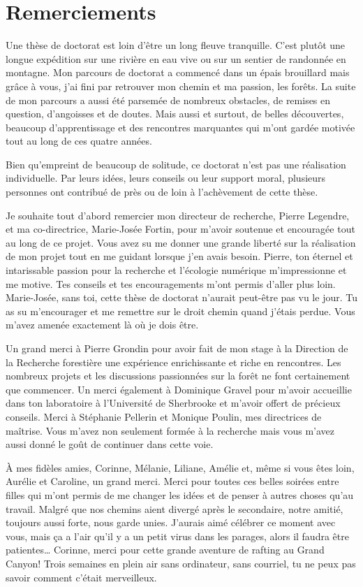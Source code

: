 \francais

\chapter*{Remerciements}

Une thèse de doctorat est loin d'être un long fleuve tranquille. C'est
plutôt une longue expédition sur une rivière en eau vive ou sur un
sentier de randonnée en montagne. Mon parcours de doctorat a commencé
dans un épais brouillard mais grâce à vous, j'ai fini par retrouver mon
chemin et ma passion, les forêts. La suite de mon parcours a aussi été
parsemée de nombreux obstacles, de remises en question, d'angoisses et
de doutes. Mais aussi et surtout, de belles découvertes, beaucoup
d'apprentissage et des rencontres marquantes qui m'ont gardée motivée
tout au long de ces quatre années.

Bien qu'empreint de beaucoup de solitude, ce doctorat n'est pas une
réalisation individuelle. Par leurs idées, leurs conseils ou leur
support moral, plusieurs personnes ont contribué de près ou de loin à
l'achèvement de cette thèse.

Je souhaite tout d'abord remercier mon directeur de recherche, Pierre
Legendre, et ma co-directrice, Marie-Josée Fortin, pour m'avoir soutenue
et encouragée tout au long de ce projet. Vous avez su me donner une
grande liberté sur la réalisation de mon projet tout en me guidant
lorsque j'en avais besoin. Pierre, ton éternel et intarissable passion
pour la recherche et l'écologie numérique m'impressionne et me motive.
Tes conseils et tes encouragements m'ont permis d'aller plus loin.
Marie-Josée, sans toi, cette thèse de doctorat n'aurait peut-être pas vu
le jour. Tu as su m'encourager et me remettre sur le droit chemin quand
j'étais perdue. Vous m'avez amenée exactement là où je dois être.

Un grand merci à Pierre Grondin pour avoir fait de mon stage à la
Direction de la Recherche forestière une expérience enrichissante et
riche en rencontres. Les nombreux projets et les discussions passionnées
sur la forêt ne font certainement que commencer. Un merci également à
Dominique Gravel pour m'avoir accueillie dans ton laboratoire à
l'Université de Sherbrooke et m'avoir offert de précieux conseils. Merci
à Stéphanie Pellerin et Monique Poulin, mes directrices de maîtrise.
Vous m'avez non seulement formée à la recherche mais vous m'avez aussi
donné le goût de continuer dans cette voie.

À mes fidèles amies, Corinne, Mélanie, Liliane, Amélie et, même si vous
êtes loin, Aurélie et Caroline, un grand merci. Merci pour toutes ces
belles soirées entre filles qui m'ont permis de me changer les idées et
de penser à autres choses qu'au travail. Malgré que nos chemins aient
divergé après le secondaire, notre amitié, toujours aussi forte, nous
garde unies. J'aurais aimé célébrer ce moment avec vous, mais ça a l'air
qu'il y a un petit virus dans les parages, alors il faudra être
patientes\ldots{} Corinne, merci pour cette grande aventure de rafting
au Grand Canyon! Trois semaines en plein air sans ordinateur, sans
courriel, tu ne peux pas savoir comment c'était merveilleux.

